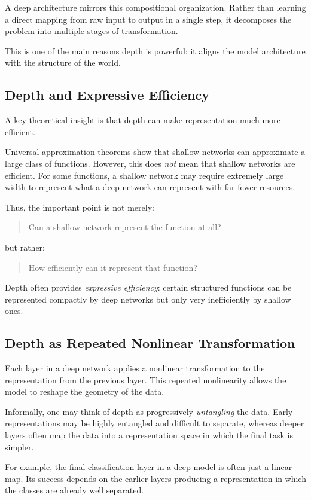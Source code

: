 A deep architecture mirrors this compositional organization. Rather than learning a direct mapping from raw input to output in a single step, it decomposes the problem into multiple stages of transformation.

This is one of the main reasons depth is powerful: it aligns the model architecture with the structure of the world.

\subsection{Depth and Expressive Efficiency}

A key theoretical insight is that depth can make representation much more efficient.

Universal approximation theorems show that shallow networks can approximate a large class of functions. However, this does \emph{not} mean that shallow networks are efficient. For some functions, a shallow network may require extremely large width to represent what a deep network can represent with far fewer resources.

Thus, the important point is not merely:
\begin{quote}
Can a shallow network represent the function at all?
\end{quote}
but rather:
\begin{quote}
How efficiently can it represent that function?
\end{quote}

Depth often provides \emph{expressive efficiency}: certain structured functions can be represented compactly by deep networks but only very inefficiently by shallow ones.

\subsection{Depth as Repeated Nonlinear Transformation}

Each layer in a deep network applies a nonlinear transformation to the representation from the previous layer. This repeated nonlinearity allows the model to reshape the geometry of the data.

Informally, one may think of depth as progressively \emph{untangling} the data. Early representations may be highly entangled and difficult to separate, whereas deeper layers often map the data into a representation space in which the final task is simpler.

For example, the final classification layer in a deep model is often just a linear map. Its success depends on the earlier layers producing a representation in which the classes are already well separated.


